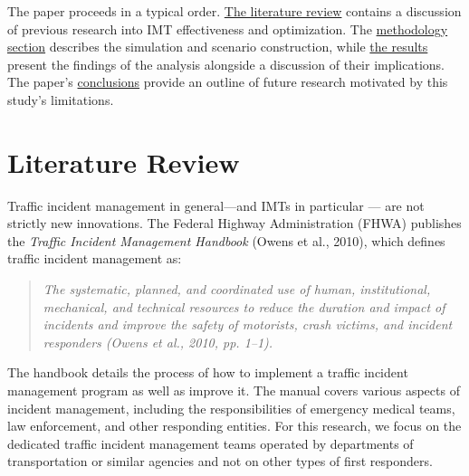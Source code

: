 \documentclass[fancy, oneside, mastersfancy, ms]{byuthesis}
\begin{document}
The paper proceeds in a typical order.
\protect\hyperlink{sec-literature}{The literature review} contains a
discussion of previous research into IMT effectiveness and optimization.
The \protect\hyperlink{sec-methods}{methodology section} describes the
simulation and scenario construction, while
\protect\hyperlink{sec-results}{the results} present the findings of the
analysis alongside a discussion of their implications. The paper's
\protect\hyperlink{sec-conclusions}{conclusions} provide an outline of
future research motivated by this study's limitations.


\hypertarget{sec-literature}{%
\chapter{Literature Review}\label{sec-literature}}

Traffic incident management in general---and IMTs in particular --- are
not strictly new innovations. The Federal Highway Administration (FHWA)
publishes the \emph{Traffic Incident Management Handbook} (Owens et al.,
2010), which defines traffic incident management as:

\begin{quote}
\emph{The systematic, planned, and coordinated use of human,
institutional, mechanical, and technical resources to reduce the
duration and impact of incidents and improve the safety of motorists,
crash victims, and incident responders (Owens et al., 2010, pp. 1--1).}
\end{quote}

\noindent The handbook details the process of how to implement a traffic
incident management program as well as improve it. The manual covers
various aspects of incident management, including the responsibilities
of emergency medical teams, law enforcement, and other responding
entities. For this research, we focus on the dedicated traffic incident
management teams operated by departments of transportation or similar
agencies and not on other types of first responders.
\end{document}
